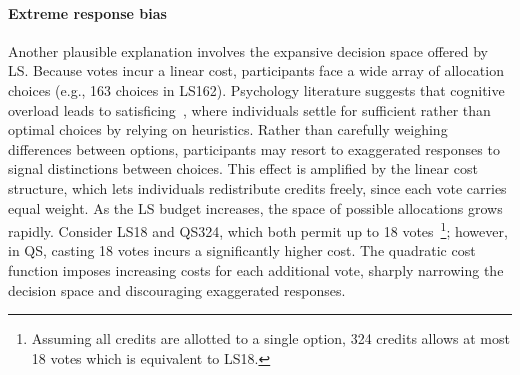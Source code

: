 \paragraph{Extreme response bias}
Another plausible explanation involves the expansive decision space offered by LS. Because votes incur a linear cost, participants face a wide array of allocation choices (e.g., 163 choices in LS162). Psychology literature suggests that cognitive overload leads to satisficing~\cite{schwartzMaximizingSatisficingHappiness2002, iyengarWhenChoiceDemotivating2000}, where individuals settle for sufficient rather than optimal choices by relying on heuristics. Rather than carefully weighing differences between options, participants may resort to exaggerated responses to signal distinctions between choices. This effect is amplified by the linear cost structure, which lets individuals redistribute credits freely, since each vote carries equal weight. As the LS budget increases, the space of possible allocations grows rapidly. Consider LS18 and QS324, which both permit up to 18 votes~\footnote{Assuming all credits are allotted to a single option, 324 credits allows at most 18 votes which is equivalent to LS18.}; however, in QS, casting 18 votes incurs a significantly higher cost. The quadratic cost function imposes increasing costs for each additional vote, sharply narrowing the decision space and discouraging exaggerated responses.

